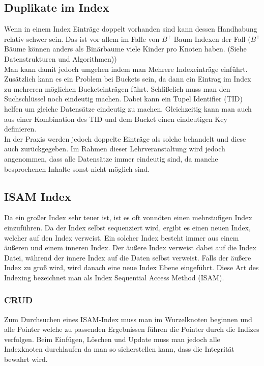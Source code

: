 \documentclass{article}
\begin{document}
	\subsection{Duplikate im Index}
	Wenn in einem Index Einträge doppelt vorhanden sind kann dessen Handhabung relativ schwer sein. Das ist vor allem im Falle von $B^+$ Baum Indexen der Fall ($B^+$ Bäume können anders als Binärbaume viele Kinder pro Knoten haben. (Siehe Datenstrukturen und Algorithmen)) \\
	Man kann damit jedoch umgehen indem man Mehrere Indexeinträge einführt. Zusätzlich kann es ein Problem bei Buckets sein, da dann ein Eintrag im Index zu mehreren möglichen Bucketeinträgen führt. Schlißelich muss man den Suchschlüssel noch eindeutig machen. Dabei kann ein Tupel Identifier (TID) helfen um gleiche Datensätze eindeutig zu machen. Gleichzeitig kann man auch aus einer Kombination des TID und dem Bucket einen eindeutigen Key definieren. \\
	In der Praxis werden jedoch doppelte Einträge als solche behandelt und diese auch zurückgegeben. Im Rahmen dieser Lehrveranstaltung wird jedoch angenommen, dass alle Datensätze immer eindeutig sind, da manche besprochenen Inhalte sonst nicht möglich sind.
	\subsection{ISAM Index}
	Da ein großer Index sehr teuer ist, ist es oft vonnöten einen mehrstufigen Index einzuführen. Da der Index selbst sequenziert wird, ergibt es einen neuen Index, welcher auf den Index verweist. Ein solcher Index besteht immer aus einem äußeren und einem inneren Index. Der äußere Index verweist dabei auf die Index Datei, während der innere Index auf die Daten selbst verweist. Falls der äußere Index zu groß wird, wird danach eine neue Index Ebene eingeführt. Diese Art des Indexing bezeichnet man als Index Sequential Access Method (ISAM).
	\subsubsection{CRUD}
	Zum Durchsuchen eines ISAM-Index muss man im Wurzelknoten beginnen und alle Pointer welche zu passenden Ergebnissen führen die Pointer durch die Indizes verfolgen. Beim Einfügen, Löschen und Update muss man jedoch alle Indexknoten durchlaufen da man so sicherstellen kann, dass die Integrität bewahrt wird.
\end{document}
